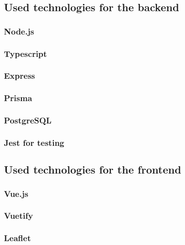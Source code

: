 
\subsection{Used technologies for the backend}


\subsubsection{Node.js}

\subsubsection{Typescript}

\subsubsection{Express}

\subsubsection{Prisma}

\subsubsection{PostgreSQL}

\subsubsection{Jest for testing}

\subsection{Used technologies for the frontend}

\subsubsection{Vue.js}

\subsubsection{Vuetify}

\subsubsection{Leaflet}